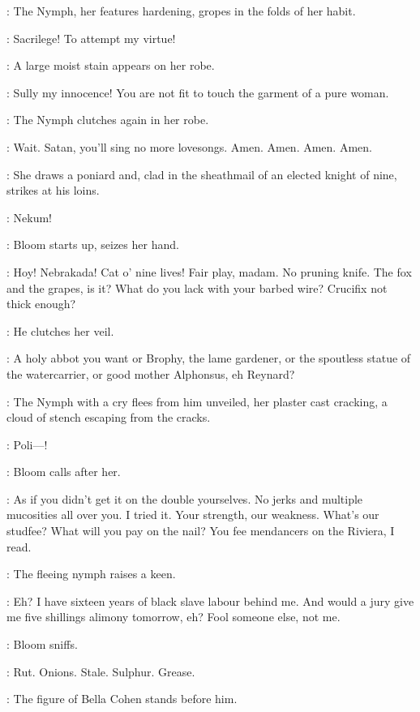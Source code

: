 :
The Nymph, her features hardening, gropes in the folds of her habit.

\Nymph:
Sacrilege!
To attempt my virtue!

:
A large moist stain appears on her robe.

\Nymph:
Sully my innocence!
You are not fit to touch the garment of a pure woman.

:
The Nymph clutches again in her robe.

\Nymph:
Wait.
Satan, you'll sing no more lovesongs.
Amen. Amen. Amen. Amen.

:
She draws a poniard and,
clad in the sheathmail of an elected knight of nine,
strikes at his loins.

\Nymph:
Nekum!

:
Bloom starts up, seizes her hand.

\Bloom:
Hoy!
Nebrakada!
Cat o' nine lives!
Fair play, madam.
No pruning knife.
The fox and the grapes, is it?
What do you lack with your barbed wire?
Crucifix not thick enough?

:
He clutches her veil.

\Bloom:
A holy abbot you want or Brophy, the lame gardener,
or the spoutless statue of the watercarrier,
or good mother Alphonsus, eh Reynard?

:
The Nymph with a cry flees from him unveiled, her plaster cast cracking,
a cloud of stench escaping from the cracks.

\Nymph:
Poli---!

:
Bloom calls after her.

\Bloom:
As if you didn't get it on the double yourselves.
No jerks and multiple mucosities all over you.
I tried it.
Your strength, our weakness.
What's our studfee?
What will you pay on the nail?
You fee mendancers on the Riviera, I read.

:
The fleeing nymph raises a keen.

\Bloom:
Eh?
I have sixteen years of black slave labour behind me.
And would a jury give me five shillings alimony tomorrow, eh?
Fool someone else, not me.

:
Bloom sniffs.

\Bloom:
Rut. Onions. Stale. Sulphur. Grease.


:
The figure of Bella Cohen stands before him.

